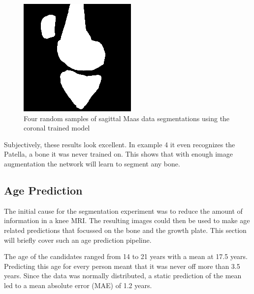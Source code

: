 \begin{figure}[H]
\endminipage\hfill
{}%
  \includegraphics[width=\linewidth]{imgs/transfer_pers_y4.png}
\endminipage
\caption{Four random samples of sagittal Maas data segmentations using the coronal trained model}
\end{figure}

Subjectively, these results look excellent. In example 4 it even recognizes the Patella, a bone it was never trained on. This shows that with enough image augmentation the network will learn to segment any bone.

\subsection{Age Prediction}

The initial cause for the segmentation experiment was to reduce the amount of information in a knee MRI. The resulting images could then be used to make age related predictions that focussed on the bone and the growth plate. This section will briefly cover such an age prediction pipeline.

The age of the candidates ranged from 14 to 21 years with a mean at 17.5 years. Predicting this age for every person meant that it was never off more than 3.5 years. Since the data was normally distributed, a static prediction of the mean led to a mean absolute error (MAE) of 1.2 years.

